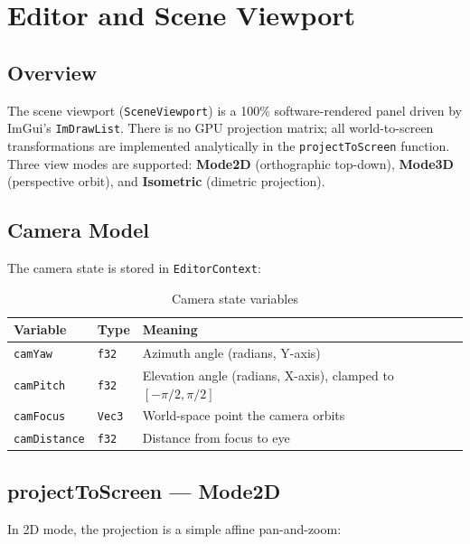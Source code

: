 \chapter{Editor and Scene Viewport}

\section{Overview}

The scene viewport (\texttt{SceneViewport}) is a 100\% software-rendered
panel driven by ImGui's \texttt{ImDrawList}. There is no GPU projection
matrix; all world-to-screen transformations are implemented analytically
in the \texttt{projectToScreen} function. Three view modes are supported:
\textbf{Mode2D} (orthographic top-down), \textbf{Mode3D} (perspective
orbit), and \textbf{Isometric} (dimetric projection).

\section{Camera Model}

The camera state is stored in \texttt{EditorContext}:

\begin{table}[H]
\centering
\caption{Camera state variables}
\begin{tabular}{lll}
\toprule
\textbf{Variable} & \textbf{Type} & \textbf{Meaning} \\
\midrule
\texttt{camYaw}      & \texttt{f32} & Azimuth angle (radians, Y-axis) \\
\texttt{camPitch}    & \texttt{f32} & Elevation angle (radians, X-axis), clamped to $[-\pi/2, \pi/2]$ \\
\texttt{camFocus}    & \texttt{Vec3} & World-space point the camera orbits \\
\texttt{camDistance} & \texttt{f32} & Distance from focus to eye \\
\bottomrule
\end{tabular}
\end{table}

\section{projectToScreen --- Mode2D}

In 2D mode, the projection is a simple affine pan-and-zoom:

